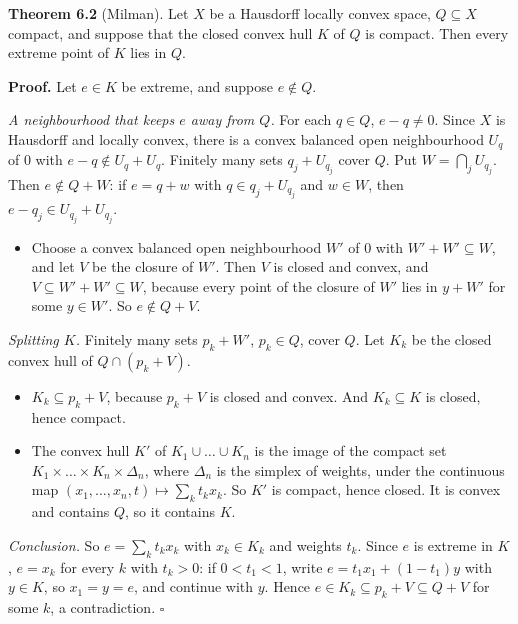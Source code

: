 \documentclass[
  english,
  11pt,
  a4paper,
]{article}
\providecommand{\tightlist}{%
  \setlength{\itemsep}{0pt}\setlength{\parskip}{0pt}}
\begin{document}
\textbf{Theorem 6.2} (Milman). Let \(X\) be a Hausdorff locally convex
space, \(Q\subseteq X\) compact, and suppose that the closed convex hull
\(K\) of \(Q\) is compact. Then every extreme point of \(K\) lies in
\(Q\).

\textbf{Proof.} Let \(e\in K\) be extreme, and suppose \(e\notin Q\).

\emph{A neighbourhood that keeps \(e\) away from \(Q\).} For each
\(q\in Q\), \(e-q\neq0\). Since \(X\) is Hausdorff and locally convex,
there is a convex balanced open neighbourhood \(U_q\) of \(0\) with
\(e-q\notin U_q+U_q\). Finitely many sets \(q_j+U_{q_j}\) cover \(Q\).
Put \(W=\bigcap_jU_{q_j}\). Then \(e\notin Q+W\): if \(e=q+w\) with
\(q\in q_j+U_{q_j}\) and \(w\in W\), then \(e-q_j\in U_{q_j}+U_{q_j}\).

\begin{itemize}
\tightlist
\item
  Choose a convex balanced open neighbourhood \(W'\) of \(0\) with
  \(W'+W'\subseteq W\), and let \(V\) be the closure of \(W'\). Then
  \(V\) is closed and convex, and \(V\subseteq W'+W'\subseteq W\),
  because every point of the closure of \(W'\) lies in \(y+W'\) for some
  \(y\in W'\). So \(e\notin Q+V\).
\end{itemize}

\emph{Splitting \(K\).} Finitely many sets \(p_k+W'\), \(p_k\in Q\),
cover \(Q\). Let \(K_k\) be the closed convex hull of \(Q\cap(p_k+V)\).

\begin{itemize}
\tightlist
\item
  \(K_k\subseteq p_k+V\), because \(p_k+V\) is closed and convex. And
  \(K_k\subseteq K\) is closed, hence compact.
\item
  The convex hull \(K'\) of \(K_1\cup\dots\cup K_n\) is the image of the
  compact set \(K_1\times\dots\times K_n\times\Delta_n\), where
  \(\Delta_n\) is the simplex of weights, under the continuous map
  \((x_1,\dots,x_n,t)\mapsto\sum_kt_kx_k\). So \(K'\) is compact, hence
  closed. It is convex and contains \(Q\), so it contains \(K\).
\end{itemize}

\emph{Conclusion.} So \(e=\sum_kt_kx_k\) with \(x_k\in K_k\) and weights
\(t_k\). Since \(e\) is extreme in \(K\), \(e=x_k\) for every \(k\) with
\(t_k>0\): if \(0<t_1<1\), write \(e=t_1x_1+(1-t_1)y\) with \(y\in K\),
so \(x_1=y=e\), and continue with \(y\). Hence
\(e\in K_k\subseteq p_k+V\subseteq Q+V\) for some \(k\), a
contradiction. \(\square\)
\end{document}
